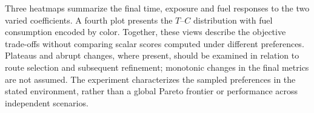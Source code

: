 Three heatmaps summarize the final time, exposure and fuel responses to
the two varied coefficients. A fourth plot presents the $T$--$C$ distribution
with fuel consumption encoded by color. Together, these views describe
the objective trade-offs without comparing scalar scores computed under
different preferences. Plateaus and abrupt changes, where present, should
be examined in relation to route selection and subsequent refinement;
monotonic changes in the final metrics are not assumed. The experiment
characterizes the sampled preferences in the stated environment, rather
than a global Pareto frontier or performance across independent scenarios.


